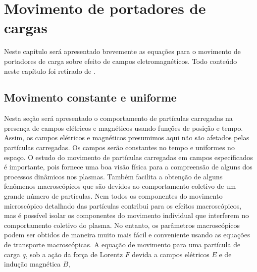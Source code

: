 \documentclass[12pt,oneside,a4paper]{abntex2}
\begin{document}
\UseRawInputEncoding

{}

\UseRawInputEncoding

{}

\UseRawInputEncoding

{}

\UseRawInputEncoding

{}


\chapter{Movimento de portadores de cargas}
\label{portcargas}
\noindent Neste capítulo será apresentado brevemente as equações para o movimento de portadores de carga sobre efeito de campos eletromagnéticos. Todo conteúdo neste capítulo foi retirado de \cite[cap 2]{bittencourt}.

\section{Movimento constante e uniforme}
\noindent Nesta seção será apresentado o comportamento de partículas carregadas na presença de campos elétricos e magnéticos usando funções de posição e tempo. Assim, os campos elétricos e magnéticos presumimos aqui não são afetados pelas partículas carregadas.
Os campos serão constantes no tempo e uniformes no espaço. 
O estudo do movimento de partículas carregadas em campos especificados é importante, pois fornece uma boa visão física para a compreensão de alguns dos processos dinâmicos nos plasmas. Também facilita a obtenção de alguns fenômenos macroscópicos que são devidos ao comportamento coletivo de um grande número de partículas. Nem todos os componentes do
movimento microscópico detalhado das partículas contribui para os efeitos macroscópicos, mas é possível isolar os componentes do movimento individual que interferem no comportamento coletivo do plasma. No entanto, os parâmetros macroscópicos  podem ser obtidos de maneira muito mais fácil e conveniente
usando as equações de transporte macroscópicas.
A equação de movimento para uma partícula de carga $q$, sob a ação da força de Lorentz $F$ devida a campos elétricos $E$ e de indução magnética $B$,
\end{document}
